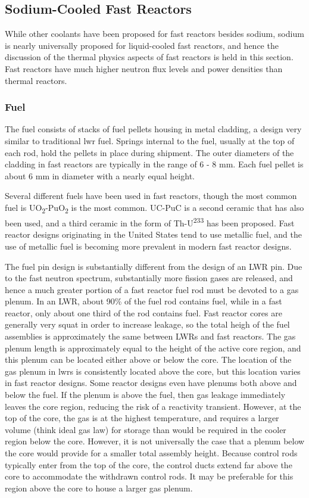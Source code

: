 \documentclass[10pt]{article}
\numberwithin{equation}{section} %
\begin{document}
\subsection{Sodium-Cooled Fast Reactors}

While other coolants have been proposed for fast reactors besides sodium, sodium is nearly universally proposed for liquid-cooled fast reactors, and hence the discussion of the thermal physics aspects of fast reactors is held in this section. Fast reactors have much higher neutron flux levels and power densities than thermal reactors. 

\subsubsection{Fuel}
The fuel consists of stacks of fuel pellets housing in metal cladding, a design very similar to traditional \gls{lwr} fuel. Springs internal to the fuel, usually at the top of each rod, hold the pellets in place during shipment. The outer diameters of the cladding in fast reactors are typically in the range of 6 - 8 mm. Each fuel pellet is about 6 mm in diameter with a nearly equal height. 

Several different fuels have been used in fast reactors, though the most common fuel is UO\textsubscript{2}-PuO\textsubscript{2} is the most common. UC-PuC is a second ceramic that has also been used, and a third ceramic in the form of Th-U\textsuperscript{233} has been proposed. Fast reactor designs originating in the United States tend to use metallic fuel, and the use of metallic fuel is becoming more prevalent in modern fast reactor designs. 

The fuel pin design is substantially different from the design of an LWR pin. Due to the fast neutron spectrum, substantially more fission gases are released, and hence a much greater portion of a fast reactor fuel rod must be devoted to a gas plenum. In an LWR, about 90\% of the fuel rod contains fuel, while in a fast reactor, only about one third of the rod contains fuel. Fast reactor cores are generally very squat in order to increase leakage, so the total heigh of the fuel assemblies is approximately the same between LWRs and fast reactors. The gas plenum length is approximately equal to the height of the active core region, and this plenum can be located either above or below the core. The location of the gas plenum in \gls{lwr}s is consistently located above the core, but this location varies in fast reactor designs. Some reactor designs even have plenums both above and below the fuel. If the plenum is above the fuel, then gas leakage immediately leaves the core region, reducing the risk of a reactivity transient. However, at the top of the core, the gas is at the highest temperature, and requires a larger volume (think ideal gas law) for storage than would be required in the cooler region below the core. However, it is not universally the case that a plenum below the core would provide for a smaller total assembly height. Because control rods typically enter from the top of the core, the control ducts extend far above the core to accommodate the withdrawn control rods. It may be preferable for this region above the core to house a larger gas plenum. 
\end{document}
